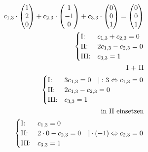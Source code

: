 \begin{align*}
    c_{1,3} \cdot \begin{pmatrix}
        1 \\ 2 \\ 0
    \end{pmatrix} + c_{2, 3} \cdot \begin{pmatrix}
        1 \\ -1 \\ 0
    \end{pmatrix} + c_{3, 3} \cdot \begin{pmatrix}
        0 \\ 0 \\ 1
    \end{pmatrix} = \begin{pmatrix}
        0 \\ 0 \\ 1
    \end{pmatrix} \\
    \begin{cases}
        \text{I:\@} & c_{1,3} + c_{2,3} = 0 \\
        \text{II:\@} & 2c_{1,3} - c_{2,3} = 0 \\
        \text{III:\@} & c_{3,3} = 1
    \end{cases} \\
    \text{I + II} \\
    \begin{cases}
        \text{I:\@} & 3c_{1,3}  = 0 \quad | : 3 \Leftrightarrow c_{1,3} = 0\\
        \text{II:\@} & 2c_{1,3} - c_{2,3} = 0 \\
        \text{III:\@} & c_{3,3} = 1
    \end{cases} \\
    \text{in II einsetzen} \\
    \begin{cases}
        \text{I:\@} & c_{1,3} = 0\\
        \text{II:\@} & 2 \cdot 0 - c_{2, 3} = 0 \quad | \cdot (-1) \Leftrightarrow c_{2, 3} = 0\\
        \text{III:\@} & c_{3,3} = 1
    \end{cases} \\
\end{align*}

